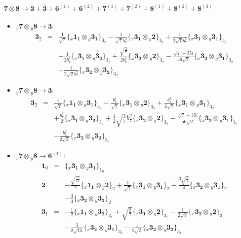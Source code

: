 \documentclass[english]{article}
\newcommand{\rep}[1]{\mathbf{#1}}
\newcommand{\repx}[2]{{}_{#2}\mathbf{#1}}
\newcommand{\subcg}[3]{\big\{ \repx{#1}{x}\otimes\repx{#2}{y}\big\}^{}_{#3}}
\begin{document}
\paragraph*{\Large $\rep{7}\otimes\rep{8}\to\rep{3}+\rep{\bar{3}}+\rep{6}^{(1)}+\rep{6}^{(2)}+\rep{7}^{(1)}+\rep{7}^{(2)}+\rep{8}^{(1)}+\rep{8}^{(2)}+\rep{8}^{(3)}$}
\begin{itemize}
\item $\repx{7}{x}\otimes\repx{8}{y}\to\rep{3}$:
\begin{eqnarray*}
\rep{3}_{2} &=& \frac{1}{\sqrt{7}}\subcg{1_{1}}{3_{1}}{3_{2}}-\frac{1}{\sqrt{7} b_7^4}\subcg{3_{1}}{2}{3_{2}}+\frac{1}{2 \sqrt{7} b_7^3}\subcg{3_{1}}{3_{1}}{3_{2}} \\ 
 & & +\frac{1}{2 b_7^3}\subcg{3_{1}}{3_{2}}{3_{2}}+\frac{\sqrt{\frac{3}{7}}}{2 b_7^2}\subcg{3_{2}}{2}{3_{2}}-\frac{\sqrt{7}+35 i}{56 \sqrt{2}}\subcg{3_{2}}{3_{1}}{3_{2}} \\ 
 & & -\frac{1}{2 \sqrt{2} b_7^2}\subcg{3_{2}}{3_{2}}{3_{2}}
\end{eqnarray*}
\item $\repx{7}{x}\otimes\repx{8}{y}\to\rep{\bar{3}}$:
\begin{eqnarray*}
\rep{3}_{2} &=& \frac{1}{\sqrt{7}}\subcg{1_{1}}{3_{1}}{3_{2}}-\frac{b_7^4}{\sqrt{7}}\subcg{3_{1}}{2}{3_{2}}+\frac{b_7^3}{2 \sqrt{7}}\subcg{3_{1}}{3_{1}}{3_{2}} \\ 
 & & +\frac{b_7^3}{2}\subcg{3_{1}}{3_{2}}{3_{2}}+\frac{1}{2} \sqrt{\frac{3}{7}} b_7^2\subcg{3_{2}}{2}{3_{2}}-\frac{\sqrt{7}-35 i}{56 \sqrt{2}}\subcg{3_{2}}{3_{1}}{3_{2}} \\ 
 & & -\frac{b_7^2}{2 \sqrt{2}}\subcg{3_{2}}{3_{2}}{3_{2}}
\end{eqnarray*}
\item $\repx{7}{x}\otimes\repx{8}{y}\to\rep{6}^{(1)}$:
\begin{eqnarray*}
\rep{1}_{0} &=& \subcg{3_{1}}{3_{1}}{1_{0}}
\\
\rep{2} &=& -\frac{\sqrt{\frac{3}{14}}}{2}\subcg{1_{1}}{2}{2}+\frac{1}{\sqrt{7}}\subcg{3_{1}}{3_{1}}{2}+\frac{3 \sqrt{\frac{3}{7}}}{4}\subcg{3_{2}}{3_{1}}{2} \\ 
 & & -\frac{3}{4}\subcg{3_{2}}{3_{2}}{2}
\\
\rep{3}_{1} &=& -\frac{1}{2}\subcg{1_{1}}{3_{2}}{3_{1}}+\sqrt{\frac{3}{7}}\subcg{3_{1}}{2}{3_{1}}-\frac{1}{2 \sqrt{7}}\subcg{3_{2}}{2}{3_{1}} \\ 
 & & -\frac{3}{2 \sqrt{14}}\subcg{3_{2}}{3_{1}}{3_{1}}-\frac{1}{2 \sqrt{2}}\subcg{3_{2}}{3_{2}}{3_{1}}
\end{eqnarray*}

\end{itemize}
\end{document}
